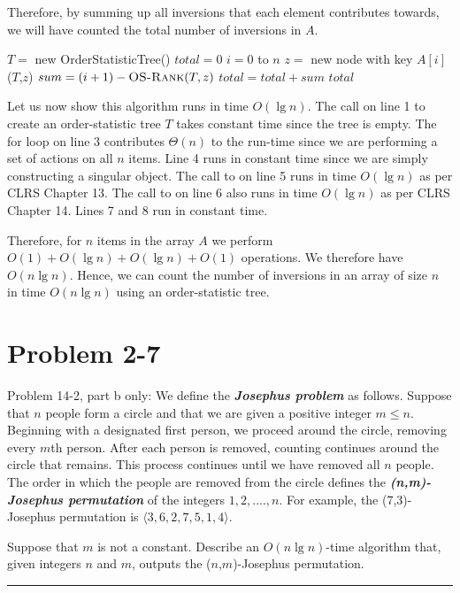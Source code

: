 \documentclass[11pt]{article}
\def\separateline{\medskip\hrule\medskip}
\begin{document}
Therefore, by summing up all inversions that each element contributes towards, we will have counted the total number of inversions in $A$.

\begin{codebox}
\li $T = $ new OrderStatisticTree()
\li $total = 0$
\li \For $i=0$ to $n$ \Do
\li     $z = $ new node with key $A[i]$
\li     {}($T$,$z$)
\li     $sum = (i + 1) - \textnormal{\scshape OS-Rank}(T,z)$
\li     $total = total + sum$
    \End
\li \Return $total$
\end{codebox}

Let us now show this algorithm runs in time $O(\lg{n})$. The call on line 1 to create an order-statistic tree $T$ takes constant time since the tree is empty. The for loop on line 3 contributes $\Theta(n)$ to the run-time since we are performing a set of actions on all $n$ items. Line 4 runs in constant time since we are simply constructing a singular object. The call to  on line 5 runs in time $O(\lg{n})$ as per CLRS Chapter 13. The call to  on line 6 also runs in time $O(\lg{n})$ as per CLRS Chapter 14. Lines 7 and 8 run in constant time.

Therefore, for $n$ items in the array $A$ we perform $O(1) + O(\lg{n}) + O(\lg{n}) + O(1)$ operations. We therefore have $O(n\lg{n})$. Hence, we can count the number of inversions in an array of size $n$ in time $O(n\lg{n})$ using an order-statistic tree.

\newpage

\section{Problem 2-7}
Problem 14-2, part b only: We define the \textbf{\textit{Josephus problem}} as follows. Suppose that $n$ people form a circle and that we are given a positive integer $m \leq n$. Beginning with a designated first person, we proceed around the circle, removing every $m$th person. After each person is removed, counting continues around the circle that remains. This process continues until we have removed all $n$ people. The order in which the people are removed from the circle defines the \textbf{\textit{(n,m)-Josephus permutation}} of the integers $1,2,....,n$. For example, the (7,3)-Josephus permutation is $\langle 3,6,2,7,5,1,4 \rangle$.

Suppose that $m$ is not a constant. Describe an $O(n\lg{n})$-time algorithm that, given integers $n$ and $m$, outputs the ($n$,$m$)-Josephus permutation.
\separateline
\end{document}
